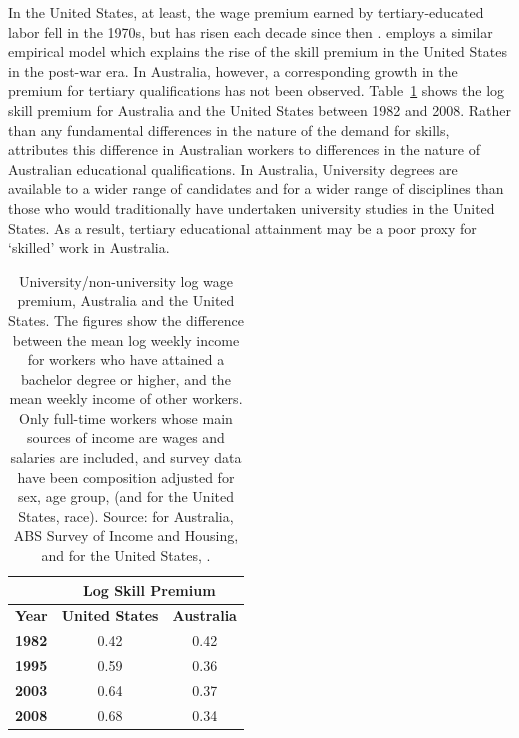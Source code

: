 \documentclass[a4paper,11pt,notitlepage]{article}
\begin{document}
In the United States, at least, the wage premium earned by tertiary-educated labor fell in the 1970s, but has risen each decade since then \citep{Acemoglu2011}. \citet{Katz1992} employs a similar empirical model which explains the rise of the skill premium in the United States in the post-war era. In Australia, however, a corresponding growth in the premium for tertiary qualifications has not been observed. Table~\ref{tbl:wagepremium} shows the log skill premium for Australia and the United States between 1982 and 2008. Rather than any fundamental differences in the nature of the demand for skills, \citet{Coelli2009} attributes this difference in Australian workers to differences in the nature of Australian educational qualifications. In Australia, University degrees are available to a wider range of candidates and for a wider range of disciplines than those who would traditionally have undertaken university studies in the United States. As a result, tertiary educational attainment may be a poor proxy for `skilled' work in Australia.
\begin{table}
  \centering
  \begin{tabular}{lcc}
  \hline
           & \multicolumn{2}{c}{\bf Log Skill Premium} \\
\hline
{\bf Year} &	{\bf United States} & {\bf Australia} \\
{\bf 1982} &	0.42 &	0.42 \\
{\bf 1995} &	0.59 &	0.36 \\
{\bf 2003} &	0.64 &	0.37 \\
{\bf 2008} &	0.68 &	0.34 \\ \hline
\end{tabular}
  \caption{University/non-university log wage premium, Australia and the United States. The figures show the difference between the mean log weekly income for workers who have attained a bachelor degree or higher, and the mean weekly income of other workers. Only full-time workers whose main sources of income are wages and salaries are included, and survey data have been composition adjusted for sex, age group, (and for the United States, race). Source: for Australia, ABS Survey of Income and Housing, and for the United States, \citet{Acemoglu2011}.}
  \label{tbl:wagepremium}
\end{table}
\end{document}
